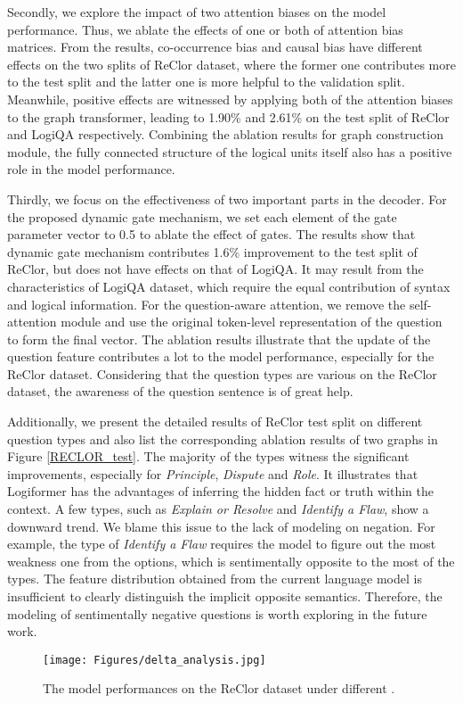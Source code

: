 \documentclass[sigconf]{acmart}
\begin{document}
Secondly, we explore the impact of two attention biases on the model 
performance. Thus, we ablate the effects of one or both of attention bias 
matrices. From the results, co-occurrence bias and causal bias have different 
effects on the two splits of ReClor dataset, where the former one contributes 
more to the test split and the latter one is more helpful to the validation 
split. Meanwhile, positive effects are witnessed by applying both of the 
attention biases to the graph transformer, leading to 1.90\% and 2.61\% on the 
test split of ReClor and LogiQA respectively. Combining the ablation results 
for graph construction module, the fully connected structure of the logical 
units itself also has a positive role in the model performance. 

Thirdly, we focus on the effectiveness of two important parts in the decoder. For the proposed dynamic gate mechanism, we set each element of the gate parameter vector  to 0.5 to ablate the effect of gates. The results show that dynamic gate mechanism contributes 1.6\% improvement to the test split of ReClor, but does not have effects on that of LogiQA. It may result from the characteristics of LogiQA dataset, which require the equal contribution of syntax and logical information. For the question-aware attention, we remove the self-attention module and use the original token-level representation of the question to form the final vector. The ablation results illustrate that the update of the question feature contributes a lot to the model performance, especially for the ReClor dataset. Considering that the question types are various on the ReClor dataset, the awareness of the question sentence is of great help.

Additionally, we present the detailed results of ReClor test split on different question types and also list the corresponding ablation results of two graphs in Figure \ref{RECLOR_test}. The majority of the types witness the significant improvements, especially for \textit{Principle}, \textit{Dispute} and \textit{Role}. It illustrates that Logiformer has the advantages of inferring the hidden fact or truth within the context. A few types, such as \textit{Explain or Resolve} and \textit{Identify a Flaw}, show a downward trend. We blame this issue to the lack of modeling on negation. For example, the type of \textit{Identify a Flaw} requires the model to figure out the most weakness one from the options, which is sentimentally opposite to the most of the types. The feature distribution obtained from the current language model is insufficient to clearly distinguish the implicit opposite semantics. Therefore, the modeling of sentimentally negative questions is worth exploring in the future work.
\begin{figure}[t]
	\large
	\centering
	\texttt{[image: Figures/delta\_analysis.jpg]}
	\vspace{-0.2cm}
	\caption{The model performances on the ReClor dataset under different .}
	\label{delta}
	\vspace{-0.5cm}
\end{figure}
\end{document}

